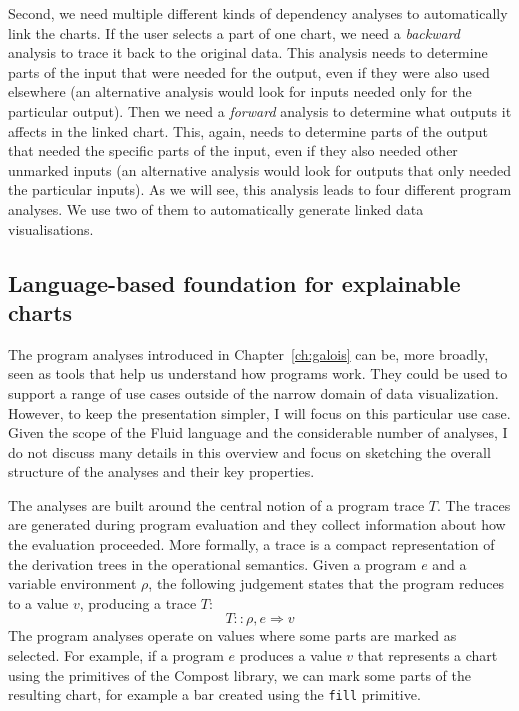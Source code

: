 \documentclass[fleqn,11pt]{report}
\theoremstyle{definition}
\begin{document}
Second, we need multiple different kinds of dependency analyses to automatically link the charts.
If the user selects a part of one chart, we need a \emph{backward} analysis to trace it back to
the original data. This analysis needs to determine parts of the input that were needed for the
output, even if they were also used elsewhere (an alternative analysis would look for inputs
needed only for the particular output).
Then we need a \emph{forward} analysis to determine what outputs it affects in the linked chart.
This, again, needs to determine parts of the output that needed the specific parts of the input,
even if they also needed other unmarked inputs (an alternative analysis would look for outputs
that only needed the particular inputs).
As we will see, this analysis leads to four different program analyses.
We use two of them to automatically generate linked data visualisations.

\newcommand*{\evalBwdR}[1]{{\mathrel{\rotatebox[origin=c]{45}{$\Rightarrow$}}}_{#1}}
\newcommand*{\evalFwdR}[1]{{\mathrel{\rotatebox[origin=c]{-45}{$\Rightarrow$}}}_{\hspace{-0.2em}#1}}
\newcommand*{\dual}[1]{{#1}^{\circ}}

\subsection{Language-based foundation for explainable charts}

The program analyses introduced in Chapter~\ref{ch:galois} can be, more broadly, seen as
tools that help us understand how programs work. They could be used to support a range of
use cases outside of the narrow domain of data visualization. However, to keep the presentation
simpler, I will focus on this particular use case. Given the scope of the Fluid language
and the considerable number of analyses, I do not discuss many details in this overview
and focus on sketching the overall structure of the analyses and their key properties.

The analyses are built around the central notion of a program trace $T$. The traces
are generated during program evaluation and they collect information about how the
evaluation proceeded. More formally, a trace is a compact representation of the derivation
trees in the operational semantics. Given a program $e$ and a variable environment $\rho$,
the following judgement states that the program reduces to a value $v$, producing a trace $T$:
%
\begin{equation*}
T :: \rho, e \Rightarrow v
\end{equation*}
%
The program analyses operate on values where some parts are marked as selected. For example,
if a program $e$ produces a value $v$ that represents a chart using the primitives of the Compost
library, we can mark some parts of the resulting chart, for example a bar created using the
\texttt{fill} primitive.
\end{document}
